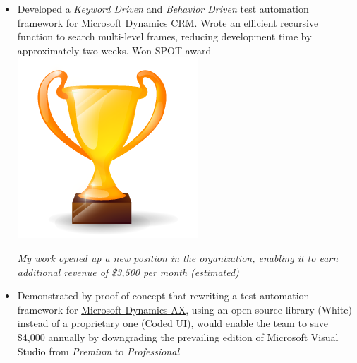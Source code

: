 \documentclass[letterpaper]{twentysecondcv} %
\begin{document}
\begin{twenty}
{\begin{itemize}
        \item Developed a \textit{Keyword Driven} and \textit{Behavior Driven} test automation framework for \href{https://www.microsoft.com/en-ca/dynamics/crm.aspx}{Microsoft Dynamics CRM}. Wrote an efficient recursive function to search multi-level frames, reducing development time by approximately two weeks. Won SPOT award {\includegraphics[scale=0.05]{img/trophy.png}}
        
        \textit{My work opened up a new position in the organization, enabling it to earn additional revenue of \$3,500 per month (estimated)}
        \item Demonstrated by proof of concept that rewriting a test automation framework for \href{https://www.microsoft.com/en-ca/dynamics/erp-ax-overview.aspx}{Microsoft Dynamics AX}, using an open source library (White) instead of a proprietary one (Coded UI), would enable the team to save \$4,000 annually by downgrading the prevailing edition of Microsoft Visual Studio from \textit{Premium} to \textit{Professional}
    \end{itemize}
    	}
        
\end{twenty}
\end{document}
